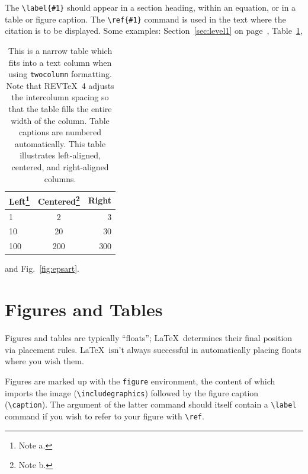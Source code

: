 \documentclass[%
 aip,
 amsmath,amssymb,
preprint,%
]{revtex4-1}
\begin{document}
The \verb+\label{#1}+ should appear in a section heading, within an
equation, or in a table or figure caption. The \verb+\ref{#1}+ command
is used in the text where the citation is to be displayed.  Some
examples: Section~\ref{sec:level1} on page~\pageref{sec:level1},
Table~\ref{tab:table1},%
\begin{table}
\caption{\label{tab:table1}This is a narrow table which fits into a
text column when using \texttt{twocolumn} formatting. Note that
REV\TeX~4 adjusts the intercolumn spacing so that the table fills the
entire width of the column. Table captions are numbered
automatically. This table illustrates left-aligned, centered, and
right-aligned columns.  }
\begin{ruledtabular}
\begin{tabular}{lcr}
Left\footnote{Note a.}&Centered\footnote{Note b.}&Right\\
\hline
1 & 2 & 3\\
10 & 20 & 30\\
100 & 200 & 300\\
\end{tabular}
\end{ruledtabular}
\end{table}
and Fig.~\ref{fig:epsart}.

\section{Figures and Tables}
Figures and tables are typically ``floats''; \LaTeX\ determines their
final position via placement rules. 
\LaTeX\ isn't always successful in automatically placing floats where you wish them.

Figures are marked up with the \texttt{figure} environment, the content of which
imports the image (\verb+\includegraphics+) followed by the figure caption (\verb+\caption+).
The argument of the latter command should itself contain a \verb+\label+ command if you
wish to refer to your figure with \verb+\ref+.
\end{document}
